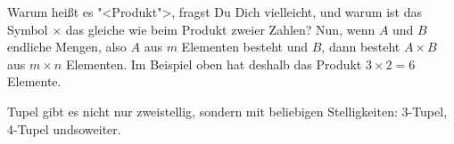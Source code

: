 Warum heißt es "<Produkt">, fragst Du Dich vielleicht, und warum ist
das Symbol $\times$ das gleiche wie beim Produkt zweier Zahlen? Nun,
wenn $A$ und $B$ endliche Mengen, also $A$ aus $m$ Elementen besteht
und $B$, dann besteht $A\times B$ aus $m\times n$ Elementen.  Im
Beispiel oben hat deshalb das Produkt $3\times 2=6$ Elemente.

Tupel gibt es nicht nur zweistellig, sondern mit beliebigen
Stelligkeiten: 3-Tupel, 4-Tupel undsoweiter.






